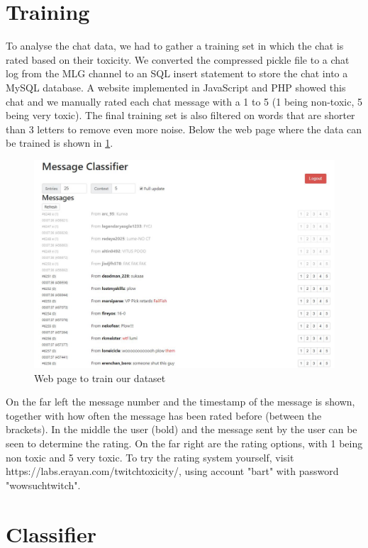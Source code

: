\documentclass[final]{report}
\begin{document}
\section{Training}
To analyse the chat data, we had to gather a training set in which the chat is rated based on their toxicity.
We converted the compressed pickle file to a chat log from the MLG channel to an SQL insert statement to store the chat into a MySQL database.
A website implemented in JavaScript and PHP showed this chat and we manually rated each chat message with a 1 to 5 (1 being non-toxic, 5 being very toxic). The final training set is also filtered on words that are shorter than 3 letters to remove even more noise. Below the web page where the data can be trained is shown in \ref{fig:rating}.

\begin{figure}[h]
\includegraphics[scale=0.5]{rating}
\caption{Web page to train our dataset}
\label{fig:rating}
\end{figure}

On the far left the message number and the timestamp of the message is shown, together with how often the message has been rated before (between the brackets). In the middle the user (bold) and the message sent by the user can be seen to determine the rating. On the far right are the rating options, with 1 being non toxic and 5 very toxic. To try the rating system yourself, visit https://labs.erayan.com/twitchtoxicity/, using account "bart" with password "wowsuchtwitch".

\clearpage

\section{Classifier}
\end{document}
